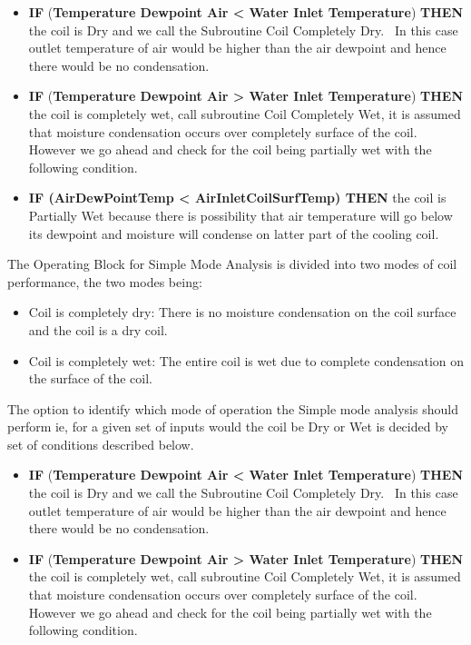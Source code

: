 \begin{itemize}
  \item
    \textbf{IF} (\textbf{Temperature Dewpoint Air \textless{} Water Inlet Temperature}) \textbf{THEN} the coil is Dry and we call the Subroutine Coil Completely Dry. ~In this case outlet temperature of air would be higher than the air dewpoint and hence there would be no condensation.
  \item
    \textbf{IF} (\textbf{Temperature Dewpoint Air \textgreater{} Water Inlet Temperature}) \textbf{THEN} the coil is completely wet, call subroutine Coil Completely Wet, it is assumed that moisture condensation occurs over completely surface of the coil. However we go ahead and check for the coil being partially wet with the following condition.
  \item
    \textbf{IF (AirDewPointTemp \textless{} AirInletCoilSurfTemp) THEN} the coil is Partially Wet because there is possibility that air temperature will go below its dewpoint and moisture will condense on latter part of the cooling coil.
\end{itemize}

The Operating Block for Simple Mode Analysis is divided into two modes of coil performance, the two modes being:

\begin{itemize}
  \item
    Coil is completely dry: There is no moisture condensation on the coil surface and the coil is a dry coil.
  \item
    Coil is completely wet: The entire coil is wet due to complete condensation on the surface of the coil.
\end{itemize}

The option to identify which mode of operation the Simple mode analysis should perform ie, for a given set of inputs would the coil be Dry or Wet is decided by set of conditions described below.

\begin{itemize}
  \item
    \textbf{IF} (\textbf{Temperature Dewpoint Air \textless{} Water Inlet Temperature}) \textbf{THEN} the coil is Dry and we call the Subroutine Coil Completely Dry.~ In this case outlet temperature of air would be higher than the air dewpoint and hence there would be no condensation.
  \item
    \textbf{IF} (\textbf{Temperature Dewpoint Air \textgreater{} Water Inlet Temperature}) \textbf{THEN} the coil is completely wet, call subroutine Coil Completely Wet, it is assumed that moisture condensation occurs over completely surface of the coil. However we go ahead and check for the coil being partially wet with the following condition.
\end{itemize}

